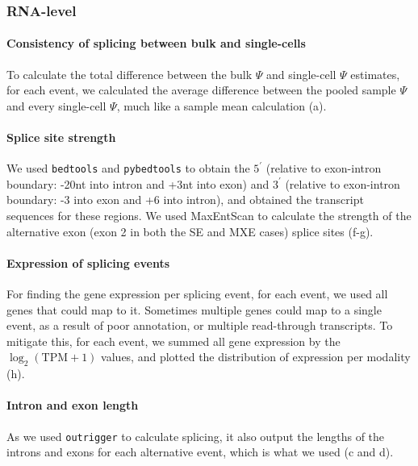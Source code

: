 \subsubsection{RNA-level}

\paragraph{Consistency of splicing between bulk and single-cells}
To calculate the total difference between the bulk $\Psi$ and single-cell $\Psi$ estimates, for each event, we calculated the average difference between the pooled sample $\Psi$ and every single-cell $\Psi$, much like a sample mean calculation (a).

\paragraph{Splice site strength}
We used \texttt{bedtools} \cite{Quinlan:2010kma} and \texttt{pybedtools} \cite{Dale:2011cl} to obtain the $5^\prime$ (relative to exon-intron boundary: -20nt into intron and +3nt into exon) and $3^\prime$ (relative to exon-intron boundary: -3 into exon and +6 into intron), and obtained the transcript sequences for these regions. We used MaxEntScan \cite{Yeo:2004iu} to calculate the strength of the alternative exon (exon 2 in both the SE and MXE cases) splice sites (f-g).

\paragraph{Expression of splicing events}
For finding the gene expression per splicing event, for each event, we used all genes that could map to it. Sometimes multiple genes could map to a single event, as a result of poor annotation, or multiple read-through transcripts. To mitigate this, for each event, we summed all gene expression by the $\log_2(\mathrm{TPM}+1)$ values, and plotted the distribution of expression per modality (h).

\paragraph{Intron and exon length}
As we used \texttt{outrigger} to calculate splicing, it also output the lengths of the introns and exons for each alternative event, which is what we used (c and d).


